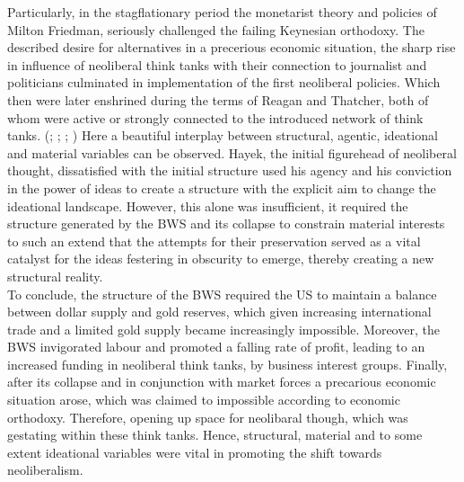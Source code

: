 \documentclass[11pt]{article}
\begin{document}
Particularly, in the stagflationary period the monetarist theory and policies of Milton Friedman, seriously challenged the failing Keynesian orthodoxy. The described desire for alternatives in a precerious economic situation, the sharp rise in influence of neoliberal think tanks with their connection to journalist and politicians culminated in implementation of the first neoliberal policies. Which then were later enshrined during the terms of Reagan and Thatcher, both of whom were active or strongly connected to the introduced network of think tanks.
(\cite[p.~223-228]{BeaudMichel1983Ahoc}; \cite[p.~63-69/77-80]{KotzDavidMDavidMichael2015Traf}; \cite[p.~ix]{1977TEot}; \cite[p.~173-174/210-211/254]{JonesDanielStedman2014Motu})
Here a beautiful interplay between structural, agentic, ideational and material variables 
can be observed. Hayek, the initial figurehead of neoliberal thought, dissatisfied with the initial structure used his agency and his conviction in the power of ideas to create a structure with the explicit aim to change the ideational landscape. However, this alone was insufficient, it required the structure generated by the BWS and its collapse to constrain material interests to such an extend that the attempts for their preservation served as a vital catalyst for the ideas festering in obscurity to emerge, thereby creating a new structural reality. \\

To conclude, the structure of the BWS required the US to maintain a balance between dollar supply and gold reserves, which given increasing international trade and a limited gold supply became increasingly impossible. Moreover, the BWS invigorated labour and promoted a falling rate of profit, leading to an increased funding in neoliberal think tanks, by business interest groups. Finally, after its collapse and in conjunction with market forces a precarious economic situation arose, which was claimed to impossible according to economic orthodoxy. Therefore, opening up space for neolibaral though, which was gestating within these think tanks. Hence, structural, material and to some extent ideational variables were vital in promoting the shift towards neoliberalism.

\printbibliography
\end{document}
